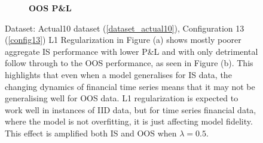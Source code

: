 \documentclass[a4paper,11pt,oneside]{article}
\theoremstyle{plain}
\theoremstyle{definition}
\begin{document}
\begin{figure}[H]
\begin{subfigure}{.5\textwidth}
			\caption{\textbf{OOS P\&L} }
			\label{figure-oos_actual_pl_reg}
		\end{subfigure}
		\caption[Effects of L1 Regularization on P\&L]
		{Dataset: Actual10 dataset (\ref{dataset_actual10}),  Configuration 13 (\ref{config13})
			\newline L1 Regularization in Figure (a) shows mostly poorer aggregate IS performance with lower P\&L and with only detrimental follow through to the OOS performance, as seen in Figure (b). This highlights that even when a model generalises for IS data, the changing dynamics of financial time series means that it may not be generalising well for OOS data. L1 regularization is expected to work well in instances of IID data, but for time series financial data, where the model is not overfitting, it is just affecting model fidelity. This effect is amplified both IS and OOS when $\lambda = 0.5$.}
		\label{figure-results-reg}
	\end{figure}
	
\end{document}
